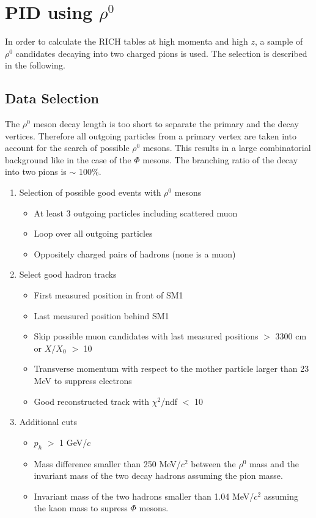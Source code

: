 \section{PID using $\rho^0$}

In order to calculate the RICH tables at high momenta and high $z$, a sample of $\rho^0$ candidates decaying into two charged pions is used. The selection is described in the following.

\subsection{Data Selection}

The $\rho^0$ meson decay length is too short to separate the primary and the decay vertices. Therefore all outgoing particles from a primary vertex are taken into account for the search of possible $\rho^0$ mesons. This results in a large combinatorial background like in the case of the $\Phi$ mesons. The branching ratio of the decay into two pions is $\sim$ 100\%.

\begin{enumerate}
  \item Selection of possible good events with $\rho^0$ mesons
  \begin{itemize}
    \item At least 3 outgoing particles including scattered muon
    \item Loop over all outgoing particles
    \item Oppositely charged pairs of hadrons (none is a muon)
  \end{itemize}
  \item Select good hadron tracks
  \begin{itemize}
    \item First measured position in front of SM1
    \item Last measured position behind SM1
    \item Skip possible muon candidates with last measured positions $>$ 3300 cm or $X/X_0$ $>$ 10
    \item Transverse momentum with respect to the mother particle larger than 23 MeV to suppress electrons
    \item Good reconstructed track with $\chi^2$/ndf $<$ 10
  \end{itemize}
  \item Additional cuts
  \begin{itemize}
    \item $p_h$ $>$ 1 GeV/$c$
    \item Mass difference smaller than 250 MeV/$c^2$ between the $\rho^0$ mass and the invariant mass of the two decay hadrons assuming the pion masse.
    \item Invariant mass of the two hadrons smaller than 1.04 MeV/$c^2$ assuming the kaon mass to supress $\Phi$ mesons.
  \end{itemize}
\end{enumerate}


